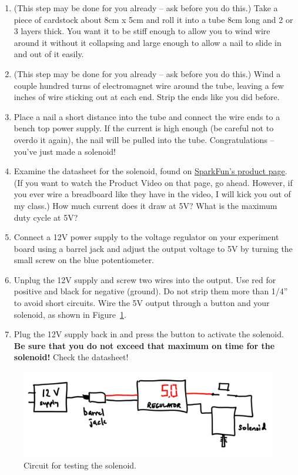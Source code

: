 \documentclass[11pt]{article} %
\begin{document}
\begin{enumerate}
\item (This step may be done for you already -- ask before you do this.) Take a piece of cardstock about 8cm x 5cm and roll it into a tube 8cm long and 2 or 3 layers thick. You want it to be stiff enough to allow you to wind wire around it without it collapsing and large enough to allow a nail to slide in and out of it easily.
\item  (This step may be done for you already -- ask before you do this.) Wind a couple hundred turns of electromagnet wire around the tube, leaving a few inches of wire sticking out at each end. Strip the ends like you did before.
\item Place a nail a short distance into the tube and connect the wire ends to a bench top power supply. If the current is high enough (be careful not to overdo it again), the nail will be pulled into the tube. Congratulations -- you’ve just made a solenoid!
\item Examine the datasheet for the solenoid, found on \href{https://www.sparkfun.com/products/11015}{\underline{SparkFun’s product page}}. (If you want to watch the Product Video on that page, go ahead. However, if you ever wire a breadboard like they have in the video, I will kick you out of my class.) How much current does it draw at 5V? What is the maximum duty cycle at 5V?
\item Connect a 12V power supply to the voltage regulator on your experiment board using a barrel jack and adjust the output voltage to 5V by turning the small screw on the blue potentiometer. \item Unplug the 12V supply and screw two wires into the output. Use red for positive and black for negative (ground). Do not strip them more than 1/4” to avoid short circuits. Wire the 5V output through a button and your solenoid, as shown in Figure~\ref{fig:solenoid.circuit}.
\item Plug the 12V supply back in and press the button to activate the solenoid. {\bf Be sure that you do not exceed that maximum on time for the solenoid!} Check the datasheet!
\end{enumerate}

\begin{figure}[htbp]
\begin{center}
\includegraphics[width=5.5in]{figures/solenoid_circuit}
\caption{Circuit for testing the solenoid.}
\label{fig:solenoid.circuit}
\end{center}
\end{figure}
\end{document}
